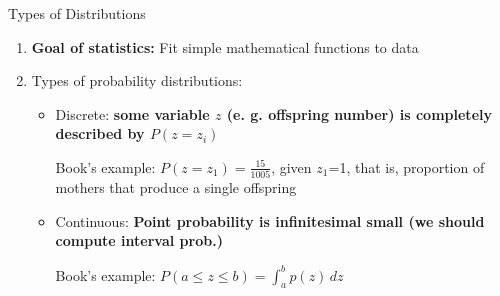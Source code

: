 \documentclass{beamer}
\begin{document}
\begin{frame}{Types of Distributions}
\begin{enumerate}

  \item<1->
    
  \textbf{Goal of statistics:} Fit simple mathematical functions  to data
  \vspace{0.4cm} 
  
  \item<2-> 
  
  Types of probability distributions:
    
  \begin{itemize}
    
  \item Discrete: \textbf{some variable $z$ (e. g. offspring number) is completely described by $P(z=z_{i})$}
   
  \vspace{0.2cm}   
  Book's example: $P(z=z_{1}) = \frac{15}{1005}$, given $z_{1}$=1, that is, proportion of mothers that produce a single offspring   
  
  \vspace{0.4cm} 
  \item Continuous: \textbf{Point probability is infinitesimal small (we should compute interval prob.)}
  
  \vspace{0.2cm} 
  Book's example: $P(a \leq z \leq b) = \int_a^b p(z)\, dz$   
  \setlength\itemsep{0.6em}
 
  \end{itemize} 
  
  
\end{enumerate} 
\end{frame}

\end{document}
